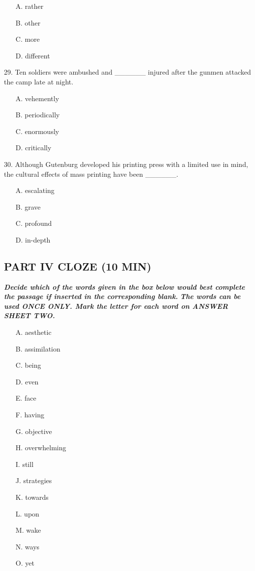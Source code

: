 \documentclass[UTF8,11pt]{ctexart}
\begin{document}
\begin{itemize}[leftmargin=2em,itemsep=.2em,topsep=.4em]\item[A.] rather
\item[B.] other
\item[C.] more
\item[D.] different
\end{itemize}

29. Ten soldiers were ambushed and \_\_\_\_\_\_ injured after the gunmen attacked the camp late at night.


\begin{itemize}[leftmargin=2em,itemsep=.2em,topsep=.4em]\item[A.] vehemently
\item[B.] periodically
\item[C.] enormously
\item[D.] critically
\end{itemize}

30. Although Gutenburg developed his printing press with a limited use in mind, the cultural effects of mass printing have been \_\_\_\_\_\_.


\begin{itemize}[leftmargin=2em,itemsep=.2em,topsep=.4em]\item[A.] escalating
\item[B.] grave
\item[C.] profound
\item[D.] in-depth
\end{itemize}

\subsection*{\textbf{PART} \textbf{IV CLOZE (10 MIN)}}


\textbf{\textit{Decide which of the words given in the box below would best complete the passage if inserted in the corresponding blank.}} \textbf{\textit{The words can be used ONCE ONLY. Mark the letter for each word on ANSWER SHEET TWO.}}


\begin{itemize}[leftmargin=2em,itemsep=.2em,topsep=.4em]\item[A.] aesthetic
\item[B.] assimilation
\item[C.] being
\item[D.] even
\item[E.] face
\item[F.] having
\item[G.] objective
\item[H.] overwhelming
\item[I.] still
\item[J.] strategies
\item[K.] towards
\item[L.] upon
\item[M.] wake
\item[N.] ways
\item[O.] yet
\end{itemize}
\end{document}
